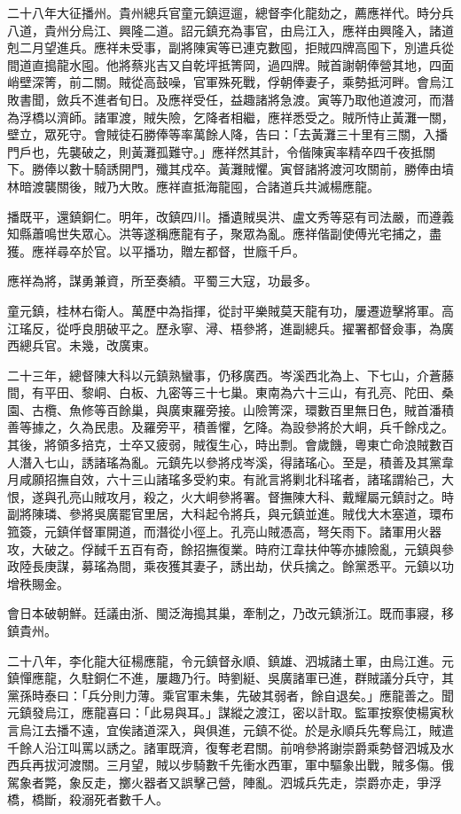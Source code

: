 \begin{pinyinscope}
二十八年大征播州。貴州總兵官童元鎮逗遛，總督李化龍劾之，薦應祥代。時分兵八道，貴州分烏江、興隆二道。詔元鎮充為事官，由烏江入，應祥由興隆入，諸道剋二月望進兵。應祥未受事，副將陳寅等已連克數囤，拒賊四牌高囤下，別遣兵從間道直搗龍水囤。他將蔡兆吉又自乾坪抵箐岡，過四牌。賊首謝朝俸營其地，四面峭壁深箐，前二關。賊從高鼓噪，官軍殊死戰，俘朝俸妻子，乘勢抵河畔。會烏江敗書聞，斂兵不進者旬日。及應祥受任，益趣諸將急渡。寅等乃取他道渡河，而潛為浮橋以濟師。諸軍渡，賊失險，乞降者相繼，應祥悉受之。賊所恃止黃灘一關，壁立，眾死守。會賊徒石勝俸等率萬餘人降，告曰：「去黃灘三十里有三關，入播門戶也，先襲破之，則黃灘孤難守。」應祥然其計，令偕陳寅率精卒四千夜抵關下。勝俸以數十騎誘開門，殲其戍卒。黃灘賊懼。寅督諸將渡河攻關前，勝俸由墳林暗渡襲關後，賊乃大敗。應祥直抵海龍囤，合諸道兵共滅楊應龍。

播既平，還鎮銅仁。明年，改鎮四川。播遺賊吳洪、盧文秀等惡有司法嚴，而遵義知縣蕭鳴世失眾心。洪等遂稱應龍有子，聚眾為亂。應祥偕副使傅光宅捕之，盡獲。應祥尋卒於官。以平播功，贈左都督，世廕千戶。

應祥為將，謀勇兼資，所至奏績。平蜀三大寇，功最多。

童元鎮，桂林右衛人。萬歷中為指揮，從討平樂賊莫天龍有功，屢遷遊擊將軍。高江瑤反，從呼良朋破平之。歷永寧、潯、梧參將，進副總兵。擢署都督僉事，為廣西總兵官。未幾，改廣東。

二十三年，總督陳大科以元鎮熟蠻事，仍移廣西。岑溪西北為上、下七山，介蒼藤間，有平田、黎峒、白板、九密等三十七巢。東南為六十三山，有孔亮、陀田、桑園、古欖、魚修等百餘巢，與廣東羅旁接。山險箐深，環數百里無日色，賊首潘積善等據之，久為民患。及羅旁平，積善懼，乞降。為設參將於大峒，兵千餘戍之。其後，將領多掊克，士卒又疲弱，賊復生心，時出剽。會歲饑，粵東亡命浪賊數百人潛入七山，誘諸瑤為亂。元鎮先以參將戍岑溪，得諸瑤心。至是，積善及其黨韋月咸願招撫自效，六十三山諸瑤多受約束。有訛言將剿北科瑤者，諸瑤謂紿己，大恨，遂與孔亮山賊攻月，殺之，火大峒參將署。督撫陳大科、戴耀屬元鎮討之。時副將陳璘、參將吳廣罷官里居，大科起令將兵，與元鎮並進。賊伐大木塞道，環布箛簽，元鎮佯督軍開道，而潛從小徑上。孔亮山賊憑高，弩矢雨下。諸軍用火器攻，大破之。俘馘千五百有奇，餘招撫復業。時府江韋扶仲等亦據險亂，元鎮與參政陸長庚謀，募瑤為間，乘夜獲其妻子，誘出劫，伏兵擒之。餘黨悉平。元鎮以功增秩賜金。

會日本破朝鮮。廷議由浙、閩泛海搗其巢，牽制之，乃改元鎮浙江。既而事寢，移鎮貴州。

二十八年，李化龍大征楊應龍，令元鎮督永順、鎮雄、泗城諸土軍，由烏江進。元鎮憚應龍，久駐銅仁不進，屢趣乃行。時劉綎、吳廣諸軍已進，群賊議分兵守，其黨孫時泰曰：「兵分則力薄。乘官軍未集，先破其弱者，餘自退矣。」應龍善之。聞元鎮發烏江，應龍喜曰：「此易與耳。」謀縱之渡江，密以計取。監軍按察使楊寅秋言烏江去播不遠，宜俟諸道深入，與俱進，元鎮不從。於是永順兵先奪烏江，賊遣千餘人沿江叫罵以誘之。諸軍既濟，復奪老君關。前哨參將謝崇爵乘勢督泗城及水西兵再拔河渡關。三月望，賊以步騎數千先衝水西軍，軍中驅象出戰，賊多傷。俄駕象者斃，象反走，擲火器者又誤擊己營，陣亂。泗城兵先走，崇爵亦走，爭浮橋，橋斷，殺溺死者數千人。


\end{pinyinscope}
